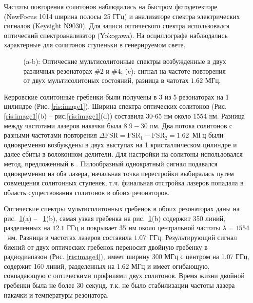 Частоты повторения солитонов наблюдались на быстром фотодетекторе (NewFocus 1014 ширина полосы 25 ГГц) и анализаторе спектра электрических сигналов (Keysight N9030). Для записи оптического спектра использовался оптический спектроанализатор (Yokogawa). На осциллографе наблюдались характерные для солитонов ступеньки в генерируемом свете.

\begin{figure}[ht]
\begin{minipage}[ht]{1\linewidth}
\end{minipage}
\caption{(a-b): Оптические мультисолитонные спектры возбужденные в двух различных резонаторах $\#2$ и $\#4$; (c): сигнал на частоте повторения от двух мультисолитоных состояний, разница в чатотах $1.62$ МГц.}
\label{ris:image3}
\end{figure}

Керровские солитонные гребенки были получены в 3 из 5 резонаторах на 1 цилиндре (Рис. \ref{ris:image1}). Ширина спектра оптических солитонов (Рис.\ref{ris:image1}(b) -- рис.\ref{ris:image1}(d)) составила 30-65 нм около 1554 нм. Разница между частотами лазеров накачки была $8.9-30$ пм. Два потока солитонов с разными частотами повторения $\Delta\mbox{FSR} = \mbox{FSR}_1 - \mbox{FSR}_2 = 1.62$~МГц были одновременно возбуждены в двух выступах на 1 кристаллическом цилиндре и далее сбиты в волоконном делители. Для настройки на солитоны использовался метод, предложенный в \cite{Herr2014}. Пилообразный однократный сигнал подавался одновременно на оба лазера, начальная точка перестройки выбиралась путем совмещения солитонных ступенек, т.ч. финальная отстройка лазеров попадала в область существования солитонов в обоих резонаторов.  

Оптические спектры мультисолитонных гребенок в обоих резонаторах даны на рис.~\ref{ris:image3}(a) -- ~\ref{ris:image3}(b), самая узкая гребенка на рис.~\ref{ris:image3}(b) содержит 350 линий, разделенных на $12.1$ ГГц и покрывает 35 нм около центральной частоты $\lambda = 1554$~нм. Разница в частотах лазеров составила $1.07$~ГГц. Результирующий сигнал биений от двух оптических гребенок переносит двойную гребенку в радиодиапазон (Рис. \ref{ris:image4}), имеет ширину 300 МГц с центром на 1.07 ГГц, содержит 160 линий, разделенных на $1.62$ МГц и имеет огибающую, совпадающую с оптическими профилями двух солитонов. Время жизни двойной гребенки была не более 30 секунд, т.к. не было стабилизации частоты лазера накачки и температуры резонатора.

